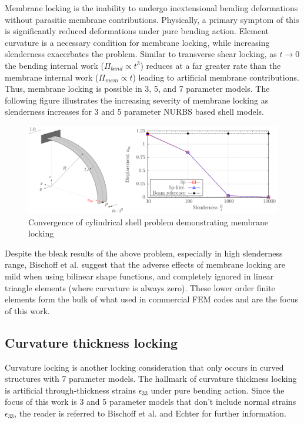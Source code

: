 Membrane locking is the inability to undergo inextensional bending deformations without parasitic membrane contributions. Physically, a primary symptom of this is significantly reduced deformations under pure bending action. Element curvature is a necessary condition for membrane locking, while increasing slenderness exacerbates the problem. Similar to transverse shear locking, as $t \rightarrow 0$ the bending internal work ($\Pi_{bend} \propto t^3$) reduces at a far greater rate than the membrane internal work ($\Pi_{mem} \propto t$) leading to artificial membrane contributions. Thus, membrane locking is possible in 3, 5, and 7 parameter models. The following figure illustrates the increasing severity of membrane locking as slenderness increases for 3 and 5 parameter NURBS based shell models.

\begin{figure}[H]
	\centering
	\def\svgwidth{\columnwidth}
	\includegraphics[width=14cm]{images/membranelocking.png}
	\caption{Convergence of cylindrical shell problem demonstrating membrane locking \cite{Echter13}}
	\label{ansexample}
\end{figure}

Despite the bleak results of the above problem, especially in high slenderness range, Bischoff et al. \cite{BischLitBook04} suggest that the adverse effects of membrane locking are mild when using bilinear shape functions, and completely ignored in linear triangle elements (where curvature is always zero). These lower order finite elements form the bulk of what used in commercial FEM codes and are the focus of this work.

\subsection{Curvature thickness locking}

Curvature locking is another locking consideration that only occurs in curved structures with 7 parameter models. The hallmark of curvature thickness locking is artificial through-thickness strains $\epsilon_{33}$ under pure bending action. Since the focus of this work is 3 and 5 parameter models that don't include normal strains $\epsilon_{33}$, the reader is referred to Bischoff et al. \cite{BischLitBook04} and Echter \cite{Echter13} for further information.





